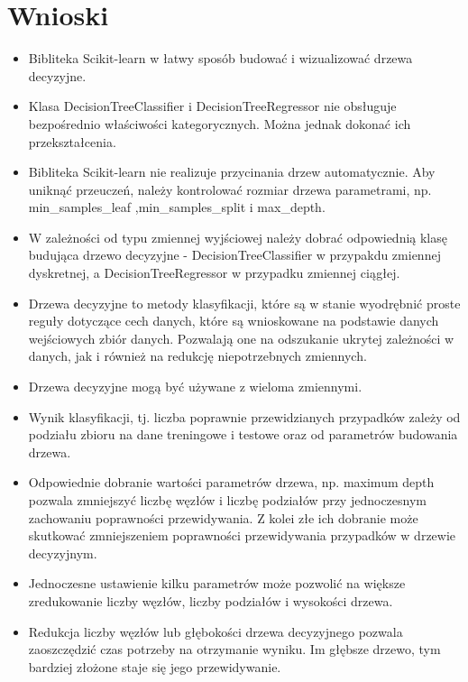 \documentclass[10pt,a4paper]{article}
\begin{document}
\section{Wnioski}
\begin{itemize}
	\item Bibliteka Scikit-learn w łatwy sposób budować i wizualizować drzewa decyzyjne.

	\item Klasa DecisionTreeClassifier i DecisionTreeRegressor nie obsługuje bezpośrednio właściwości kategorycznych. Można jednak dokonać ich przekształcenia.

	\item Bibliteka Scikit-learn nie realizuje przycinania drzew automatycznie. Aby uniknąć przeuczeń, należy kontrolować rozmiar drzewa parametrami, np. min\_samples\_leaf ,min\_samples\_split i max\_depth.

	\item W zależności od typu zmiennej wyjściowej należy dobrać odpowiednią klasę budująca drzewo decyzyjne - DecisionTreeClassifier w przypakdu zmiennej dyskretnej, a DecisionTreeRegressor w przypadku zmiennej ciągłej.
	
	\item Drzewa decyzyjne to metody klasyfikacji, które są w stanie wyodrębnić proste reguły dotyczące cech danych, które są wnioskowane na podstawie danych wejściowych
	zbiór danych. Pozwalają one na odszukanie ukrytej zależności w danych, jak i również na redukcję niepotrzebnych zmiennych.

	\item Drzewa decyzyjne mogą być używane z wieloma zmiennymi.

	\item Wynik klasyfikacji, tj. liczba poprawnie przewidzianych przypadków zależy od podziału zbioru na dane treningowe i testowe oraz od parametrów budowania drzewa.

	\item Odpowiednie dobranie wartości parametrów drzewa, np. maximum depth pozwala zmniejszyć liczbę węzłów i liczbę podziałów przy jednoczesnym zachowaniu poprawności przewidywania. Z kolei złe ich dobranie może skutkować zmniejszeniem poprawności przewidywania przypadków w drzewie decyzyjnym.

	\item Jednoczesne ustawienie kilku parametrów może pozwolić na większe zredukowanie liczby węzłów, liczby podziałów i wysokości drzewa.

	\item Redukcja liczby węzłów lub głębokości drzewa decyzyjnego pozwala zaoszczędzić czas potrzeby na otrzymanie wyniku. Im głębsze drzewo, tym bardziej złożone staje się jego przewidywanie.


\end{itemize}
\end{document}
